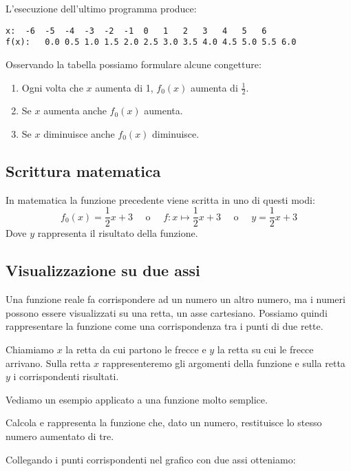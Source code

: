 L'esecuzione dell'ultimo programma produce:
\begin{lstlisting}
x:	-6	-5	-4	-3	-2	-1	0	1	2	3	4	5	6	
f(x):	0.0	0.5	1.0	1.5	2.0	2.5	3.0	3.5	4.0	4.5	5.0	5.5	6.0
\end{lstlisting}

Osservando la tabella possiamo formulare alcune congetture:

\begin{enumerate} [nosep]
\item Ogni volta che \(x\) aumenta di 1, \(f_0(x)\) aumenta di \(\frac{1}{2}\).
\item Se \(x\) aumenta anche \(f_0(x)\) aumenta.
\item Se \(x\) diminuisce anche \(f_0(x)\) diminuisce.
\end{enumerate}

\subsection{Scrittura matematica}

In matematica la funzione precedente viene scritta in uno di questi modi:
\[f_0(x) = \frac{1}{2}x +3 \quad \text{ o } \quad 
f: x \mapsto \frac{1}{2}x +3 \quad \text{ o } \quad 
y= \frac{1}{2}x +3\]
Dove \(y\) rappresenta il risultato della funzione.

\subsection{Visualizzazione su due assi}

Una funzione reale fa corrispondere ad un numero un altro numero, ma i 
numeri possono essere visualizzati su una retta, un asse cartesiano. 
Possiamo quindi rappresentare la funzione come una corrispondenza tra i 
punti di due rette.

Chiamiamo \(x\) la retta da cui partono le frecce e \(y\) la retta su cui le 
frecce arrivano.
Sulla retta \(x\) rappresenteremo gli argomenti della funzione e sulla retta 
\(y\) i corrispondenti risultati.

\dueassivuoti

Vediamo un esempio applicato a una funzione molto semplice.

\begin{esempio}
Calcola e rappresenta la funzione che, dato un numero, restituisce lo 
stesso numero aumentato di tre.


Collegando i punti corrispondenti nel grafico con due assi otteniamo:

\end{esempio}

